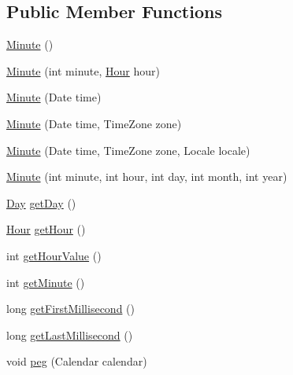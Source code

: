 \subsection*{Public Member Functions}
\begin{DoxyCompactItemize}
\item 
\mbox{\hyperlink{classorg_1_1jfree_1_1data_1_1time_1_1_minute_a11b025b5d3af255dcdba43be2cfe2a87}{Minute}} ()
\item 
\mbox{\hyperlink{classorg_1_1jfree_1_1data_1_1time_1_1_minute_aa71e3e4cd7f02dba347cff5301a5e262}{Minute}} (int minute, \mbox{\hyperlink{classorg_1_1jfree_1_1data_1_1time_1_1_hour}{Hour}} hour)
\item 
\mbox{\hyperlink{classorg_1_1jfree_1_1data_1_1time_1_1_minute_a9a576b004452a502adfdcb0888cefec7}{Minute}} (Date time)
\item 
\mbox{\hyperlink{classorg_1_1jfree_1_1data_1_1time_1_1_minute_ad062e2fff5d17e0f359a73d9ca8a08a6}{Minute}} (Date time, Time\+Zone zone)
\item 
\mbox{\hyperlink{classorg_1_1jfree_1_1data_1_1time_1_1_minute_ade79b8e2aa0020b88245409ba3e57fe6}{Minute}} (Date time, Time\+Zone zone, Locale locale)
\item 
\mbox{\hyperlink{classorg_1_1jfree_1_1data_1_1time_1_1_minute_a1e6a2472758d513c8541350f03b2a12e}{Minute}} (int minute, int hour, int day, int month, int year)
\item 
\mbox{\hyperlink{classorg_1_1jfree_1_1data_1_1time_1_1_day}{Day}} \mbox{\hyperlink{classorg_1_1jfree_1_1data_1_1time_1_1_minute_a336df021712c77e53a50cf14aa840906}{get\+Day}} ()
\item 
\mbox{\hyperlink{classorg_1_1jfree_1_1data_1_1time_1_1_hour}{Hour}} \mbox{\hyperlink{classorg_1_1jfree_1_1data_1_1time_1_1_minute_ae10e6cf4add002f4df3aa78258dd3c0b}{get\+Hour}} ()
\item 
int \mbox{\hyperlink{classorg_1_1jfree_1_1data_1_1time_1_1_minute_a913369856992923eac6f954ac19c6b95}{get\+Hour\+Value}} ()
\item 
int \mbox{\hyperlink{classorg_1_1jfree_1_1data_1_1time_1_1_minute_a01e4266b1b77c7b296786bd15975d4b2}{get\+Minute}} ()
\item 
long \mbox{\hyperlink{classorg_1_1jfree_1_1data_1_1time_1_1_minute_a7f32248c4b7738436aa841d9abcb9114}{get\+First\+Millisecond}} ()
\item 
long \mbox{\hyperlink{classorg_1_1jfree_1_1data_1_1time_1_1_minute_aa90d6502bb7d61c7fffdf9e43f2abdae}{get\+Last\+Millisecond}} ()
\item 
void \mbox{\hyperlink{classorg_1_1jfree_1_1data_1_1time_1_1_minute_ae7da5fb521ede7ac4a60122fb99266d3}{peg}} (Calendar calendar)

\end{DoxyCompactItemize}

